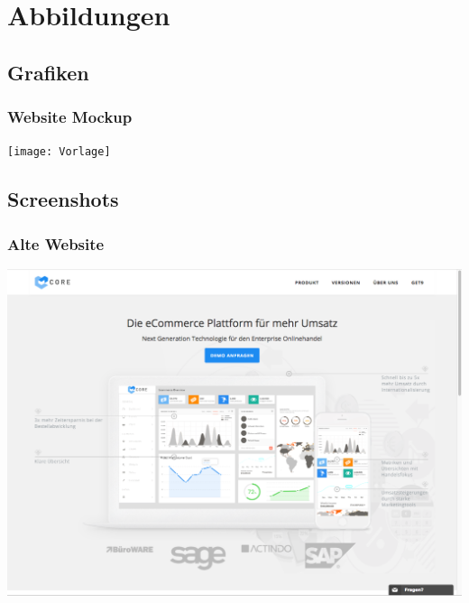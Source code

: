 \documentclass[11pt,a4paper]{article}
\begin{document}
\section{Abbildungen}

\subsection{Grafiken}
\subsubsection{Website Mockup}
\center
\texttt{[image: Vorlage]}


\subsection{Screenshots}
\subsubsection{Alte Website}
\includegraphics[scale=0.3]{getcore}
\end{document}
